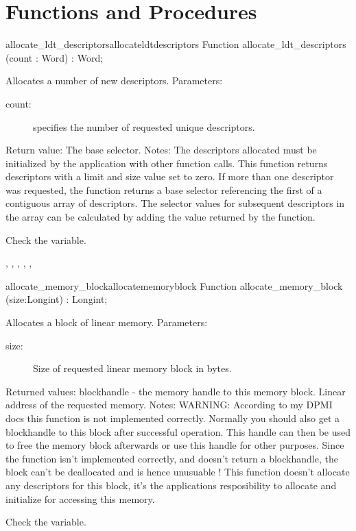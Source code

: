 \section{Functions and Procedures}
\begin{functionl}{allocate\_ldt\_descriptors}{allocateldtdescriptors}
\Declaration
Function allocate\_ldt\_descriptors (count : Word) : Word;

\Description
Allocates a number of new descriptors.
Parameters: 
\begin{description}
\item[count:\ ] specifies the number of requested unique descriptors.
\end{description}
Return value: The base selector.
Notes: The descriptors allocated must be initialized by the application with
other function calls. This function returns descriptors with a limit and
size value set to zero. If more than one descriptor was requested, the
function returns a base selector referencing the first of a contiguous array
of descriptors. The selector values for subsequent descriptors in the array
can be calculated by adding the value returned by the
function.

\Errors
 Check the  variable. 
\SeeAlso

,
,
,
,
,

\end{functionl}
\latex{}
\html{}
\begin{functionl}{allocate\_memory\_block}{allocatememoryblock}
\Declaration
Function allocate\_memory\_block (size:Longint) : Longint;

\Description
Allocates a block of linear memory.
Parameters: 
\begin{description}
\item[size:\ ] Size of requested linear memory block in bytes.
\end{description}
Returned values: blockhandle - the memory handle to this memory block. Linear
address of the requested memory.
Notes: WARNING: According to my DPMI docs this function is not implemented
correctly. Normally you should also get a blockhandle to this block after
successful operation. This handle can then be used to free the memory block
afterwards or use this handle for other purposes. Since the function isn't
implemented correctly, and doesn't return a blockhandle, the block can't be
deallocated and is hence unusuable !
This function doesn't allocate any descriptors for this block, it's the
applications resposibility to allocate and initialize for accessing this
memory.

\Errors
 Check the  variable.
\SeeAlso
\end{functionl}
